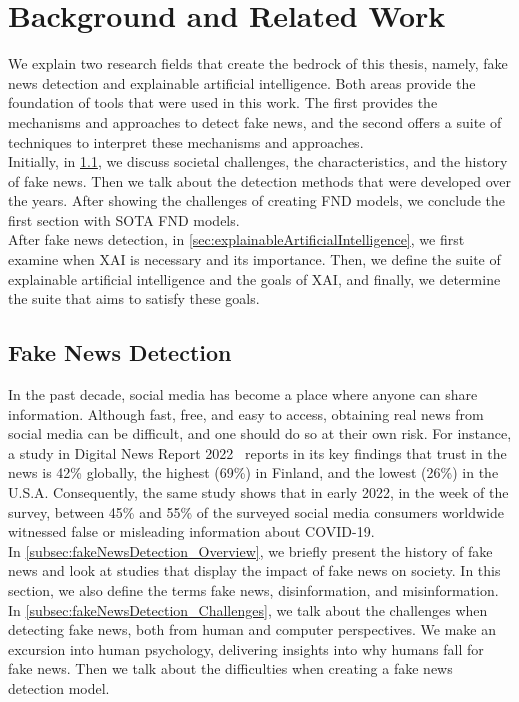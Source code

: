 
\chapter{Background and Related Work}\label{chapter:background}
We explain two research fields that create the bedrock of this thesis, namely, fake news detection and explainable artificial intelligence. Both areas provide the foundation of tools that were used in this work. The first provides the mechanisms and approaches to detect fake news, and the second offers a suite of techniques to interpret these mechanisms and approaches.\\
Initially, in \ref{sec:fakeNewsDetection}, we discuss societal challenges, the characteristics, and the history of fake news. Then we talk about the detection methods that were developed over the years. After showing the challenges of creating FND models, we conclude the first section with SOTA FND models.\\
After fake news detection, in \ref{sec:explainableArtificialIntelligence}, we first examine when XAI is necessary and its importance. Then, we define the suite of explainable artificial intelligence and the goals of XAI, and finally, we determine the suite that aims to satisfy these goals.

\section{Fake News Detection}
\label{sec:fakeNewsDetection}
In the past decade, social media has become a place where anyone can share information. Although fast, free, and easy to access, obtaining
real news from social media can be difficult, and one should do so at their own risk. For instance, a study in Digital News Report
2022~\parencite{ReutersInstituteDigitalNewsReport} reports in its key findings that trust in the news is 42\% globally, the highest (69\%)
in Finland, and the lowest (26\%) in the U.S.A. Consequently, the same study shows that in early 2022, in the week of the survey, between 45\%
and 55\% of the surveyed social media consumers worldwide witnessed false or misleading information about COVID-19. \\
In \ref{subsec:fakeNewsDetection_Overview}, we briefly present the history of fake news and look at studies that display the impact of fake news on society. In this section, we also define the terms fake news, disinformation, and misinformation. \\
In \ref{subsec:fakeNewsDetection_Challenges}, we talk about the challenges when detecting fake news, both from human and computer perspectives. We make an excursion into human psychology, delivering insights into why humans fall for fake news. Then we talk about the difficulties when creating a fake news detection model.


